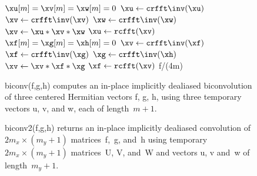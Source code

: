 \documentclass[final]{siamltex}
\begin{document}
\begin{figure}[htbp]
\begin{minipage}{0.445\linewidth}
\begin{function}[H]
  \medskip
  $\xu[m]=\xv[m]=\xw[m]=0$\;
  $\xu \leftarrow \crfft\inv(\xu)$\;
  $\xv \leftarrow \crfft\inv(\xv)$\;
  $\xw \leftarrow \crfft\inv(\xw)$\;
  $\xv \leftarrow \xu * \xv * \xw$\;
  $\xu \leftarrow \rcfft(\xv)$\;
  \medskip
  $\xf[m]=\xg[m]=\xh[m]=0$\;
  $\xv \leftarrow \crfft\inv(\xf)$\;
  $\xf \leftarrow \crfft\inv(\xg)$\;
  $\xg \leftarrow \crfft\inv(\xh)$\;
  $\xv \leftarrow \xv * \xf * \xg$\;
  $\xf \leftarrow \rcfft(\xv)$\;
  \medskip
  \Return f/(4m)\;
\caption{biconv({\sf f},{\sf g},{\sf h}) computes
an in-place implicitly dealiased biconvolution of three centered
Hermitian vectors {\sf f}, {\sf g}, {\sf h}, using three temporary vectors
{\sf u}, {\sf v}, and {\sf w}, each of length~$m+1$.}\label{biconv}
\end{function}
\end{minipage}
%
\begin{minipage}{0.5\linewidth}
\begin{function}[H]
  \Return \xf\;
\caption{biconv2({\sf f},{\sf g},{\sf h}) 
returns an in-place implicitly dealiased convolution of \hbox{$2m_x\times
(m_y+1)$} matrices~{\sf f},~{\sf g}, and~{\sf h} using
temporary \hbox{$2m_x\times (m_y+1)$} matrices~{\sf U}, {\sf V}, and~{\sf W} and
vectors {\sf u}, {\sf v} and~{\sf w} of length~$m_y+1$.
}\label{biconv2}
\end{function}
\end{minipage}
\end{figure}
\end{document}
